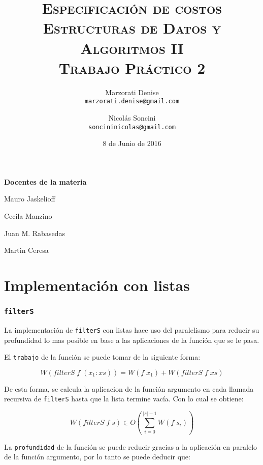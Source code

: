 \documentclass[a4paper,10pt]{article}
\author{
    Marzorati Denise \\
    \texttt{marzorati.denise@gmail.com}
    \and Nicolás Soncini \\
    \texttt{soncininicolas@gmail.com}
}
\date{
    8 de Junio de 2016
}
\title{
    \Huge \textsc{Especificación de costos} \\
    \large \textsc{Estructuras de Datos y Algoritmos II} \\
    \textsc{Trabajo Práctico 2}
}
\begin{document}
\maketitle

\thispagestyle{empty}

\begin{center}
\large \bf Docentes de la materia
\end{center}

\begin{center}
Mauro Jaskelioff

Cecila Manzino

Juan M. Rabasedas

Martin Ceresa
\end{center}

\newpage{}


\part*{Implementación con listas}


\section*{\texttt{filterS}}

    La implementación de \texttt{filterS} con listas hace uso del paralelismo para
reducir su profundidad lo mas posible en base a las aplicaciones de la función 
que se le pasa.

    El \texttt{trabajo} de la función se puede tomar de la siguiente forma:

\begin{equation*}
    W \left( filterS\; f \; \left( x_1:xs\right) \right) = W \left( f \; x_1 \right) + W \left(filterS\; f \; xs \right)
\end{equation*}

De esta forma, se calcula la aplicacion de la función argumento en cada
llamada recursiva de \texttt{filterS} hasta que la lista termine vacía. Con lo
cual se obtiene:
    
\begin{equation*}
    W \left( filterS\; f \; s \right) \in
    O \left( \sum_{i=0}^{\vert s \vert -1} W \left( f \; s_i \right) \right)
\end{equation*}


    La \texttt{profundidad} de la función se puede reducir gracias a la aplicación
en paralelo de la función argumento, por lo tanto se puede deducir que:
\end{document}
